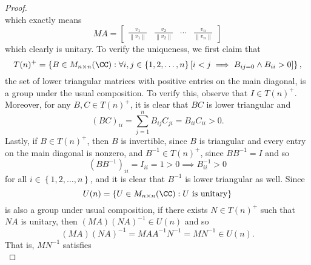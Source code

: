 \documentclass[linearalgebra]{subfiles}
\begin{document}
\begin{proof}
\begin{equation*}
        \end{equation*}
        which exactly means
        \begin{equation*}
            MA =
            \begin{bmatrix}
                \frac{v_1}{\left\lVert v_1\right\rVert } & \frac{v_2}{\left\lVert v_2\right\rVert } & \cdots & \frac{v_n}{\left\lVert v_n\right\rVert }
            \end{bmatrix}
        \end{equation*}
        which clearly is unitary. To verify the uniqueness, we first claim that
        \begin{equation*}
            T(n)^+ = \left\lbrace B\in M_{n\times n}(\CC): \forall i,j\in\left\lbrace 1,2,\ldots,n \right\rbrace \left[ i<j\implies B_{ij=0}\land B_{ii} > 0 \right]  \right\rbrace ,
        \end{equation*}
        the set of lower triangular matrices with positive entries on the main diagonal, is a group under the usual composition. To verify this, observe that $I\in T(n)^+$. Moreover, for any $B,C\in T(n)^+$, it is clear that $BC$ is lower triangular and
        \begin{equation*}
            (BC)_{ii} = \sum^{n}_{j=1} B_{ij}C_{ji} = B_{ii}C_{ii} > 0.
        \end{equation*}
        Lastly, if $B\in T(n)^+$, then $B$ is invertible, since $B$ is triangular and every entry on the main diagonal is nonzero, and $B^{-1}\in T(n)^+$, since $BB^{-1} = I$ and so
        \begin{equation*}
            \left( BB^{-1} \right) _{ii} = I_{ii} = 1 > 0 \implies B^{-1}_{ii} > 0
        \end{equation*}
        for all $i\in\left\lbrace 1,2,\ldots,n \right\rbrace$, and it is clear that $B^{-1}$ is lower triangular as well. Since
        \begin{equation*}
            U(n) = \left\lbrace U\in M_{n\times n}(\CC): U\text{ is unitary} \right\rbrace 
        \end{equation*}
        is also a group under usual composition, if there exists $N\in T(n)^+$ such that $NA$ is unitary, then $(MA)(NA)^{-1}\in U(n)$ and so
        \begin{equation*}
            (MA)(NA)^{-1} = MAA^{-1}N^{-1} = MN^{-1} \in U(n).
        \end{equation*}
        That is, $MN^{-1}$ satisfies
        \begin{equation*}

\end{equation*}
\end{proof}
\end{document}
